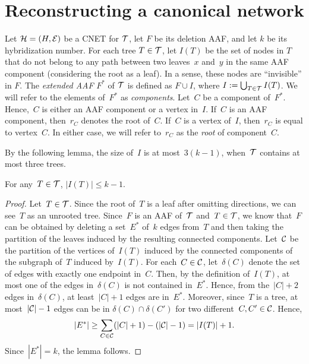 \section{Reconstructing a canonical network}

\label{sec:guessing-things}

Let $\mathcal{H} = (H, \mathcal{E})$ be a CNET for $\mathcal{T}$, let
$F$ be its deletion AAF, and let $k$ be its hybridization number.
For each tree $T \in \mathcal{T}$, let $I(T)$ be the set of nodes in $T$
that do not belong to any path between two leaves~$x$ and~$y$ in the same AAF
component (considering the root as a leaf).
In a sense, these nodes are ``invisible'' in $F$.
The \emph{extended AAF} $F^*$ of $\mathcal{T}$ is defined as
$F \cup I$, where $I := \bigcup_{T \in \mathcal{T}} I(T)$. {We will refer to the elements of~$F^*$ as \emph{components}. Let~$C$ be a component of~$F^*$. Hence,~$C$ is either an AAF component or a vertex in~$I$. If~$C$ is an AAF component, then~$r_C$ denotes the root of~$C$. If~$C$ is a vertex of~$I$, then~$r_C$ is equal to vertex~$C$. In either case, we will refer to~$r_C$ as the \emph{root} of component~$C$.}

By the following lemma, the size of~$I$ is at most~$3(k-1)$, when~$\mathcal{T}$ contains at most three trees.

\begin{lem}\label{lem:invisiblenodes}
For any~$T\in\mathcal{T}$, $|I(T)| \leq k-1$.
\end{lem}
\begin{proof}
Let~$T\in\mathcal{T}$. Since the root of~$T$ is a leaf after omitting directions, we can see~$T$ as an unrooted tree. Since~$F$ is an AAF of~$\mathcal{T}$ and~$T\in\mathcal{T}$, we know that~$F$ can be obtained by deleting a set~$E^*$ of~$k$ edges from~$T$ and then taking the partition of the leaves induced by the resulting connected components. Let~$\mathcal{C}$ be the partition of the vertices of~$I(T)$ induced by the connected components of the subgraph of~$T$ induced by~$I(T)$. For each~$C\in\mathcal{C}$, let~$\delta(C)$ denote the set of edges with exactly one endpoint in~$C$. Then, by the definition of~$I(T)$, at most one of the edges in~$\delta(C)$ is not contained in~$E^*$. Hence, from the~$|C|+2$ edges in~$\delta(C)$, at least~$|C|+1$ edges are in~$E^*$. Moreover, since~$T$ is a tree, at most~$|\mathcal{C}|-1$ edges can be in $\delta(C)\cap\delta(C')$ for two different~$C,C'\in\mathcal{C}$. Hence,
\[
|E^*| \geq \sum_{C\in\mathcal{C}} (|C|+1) - (|\mathcal{C}|-1) = |I(T)| + 1.
\]
Since~$|E^*|=k$, the lemma follows.
\end{proof}

